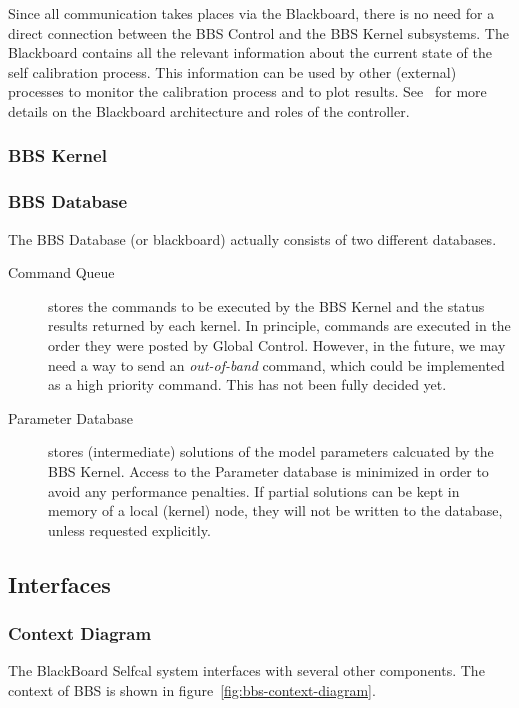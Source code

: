 \documentclass[10pt]{lofar}
\begin{document}
Since all communication takes places via the Blackboard, there is no need for
a direct connection between the BBS Control and the BBS Kernel subsystems.
The Blackboard contains all the relevant information about the current state
of the self calibration process. This information can be used by other
(external) processes to monitor the calibration process and to plot results.
See~\cite{LOFAR-ASTRON-SDD-002} for more details on the Blackboard
architecture and roles of the controller.


\subsubsection{BBS Kernel}
\label{subsubsec:sys-kernel}

\subsubsection{BBS Database}
\label{subsubsec:sys-database}
The BBS Database (or blackboard) actually consists of two different databases.
\begin{description}
\item [Command Queue] stores the commands to be executed by the BBS Kernel and the status results returned by each kernel. In principle, commands are executed in the order they were posted by Global Control. However, in the future, we may need a way to send an \emph{out-of-band} command, which could be implemented as a high priority command. This has not been fully decided yet.
\item [Parameter Database] stores (intermediate) solutions of the model parameters calcuated by the BBS Kernel. Access to the Parameter database is minimized in order to avoid any performance penalties. If partial solutions can be kept in memory of a local (kernel) node, they will not be written to the database, unless requested explicitly.
\end{description}

\subsection{Interfaces}
\label{subsec:sys-interfaces}

\subsubsection{Context Diagram}
\label{subsubsec:context}
The BlackBoard Selfcal system interfaces with several other components. The context of BBS is shown in figure~\ref{fig:bbs-context-diagram}.
\end{document}
